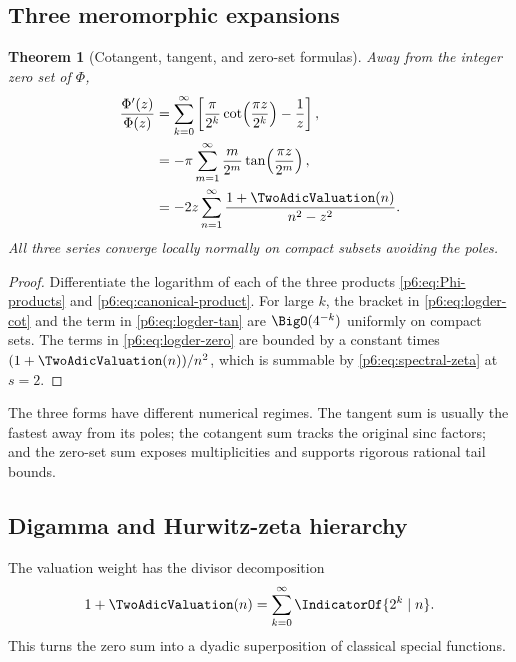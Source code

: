 \documentclass[11pt]{article}
\newtheorem{theorem}{Theorem}[section]
\theoremstyle{definition}
\theoremstyle{remark}
\begin{document}
\subsection{Three meromorphic expansions}

\begin{theorem}[Cotangent, tangent, and zero-set formulas]\label{p6:thm:three-logder}
Away from the integer zero set of \(\Phi\),
\begin{align}
 \frac{\Phi'(z)}{\Phi(z)}
 &=\sum_{k=0}^{\infty}
 \left[
 \frac{\pi}{2^k}\cot\!\left(\frac{\pi z}{2^k}\right)-\frac1z
 \right],                                                    \label{p6:eq:logder-cot}\\
 &=-\pi\sum_{m=1}^{\infty}\frac{m}{2^m}
 \tan\!\left(\frac{\pi z}{2^m}\right),                    \label{p6:eq:logder-tan}\\
 &=-2z\sum_{n=1}^{\infty}\frac{1+\TwoAdicValuation(n)}{n^2-z^2}.       \label{p6:eq:logder-zero}
\end{align}
All three series converge locally normally on compact subsets avoiding the poles.
\end{theorem}

\begin{proof}
Differentiate the logarithm of each of the three products
\eqref{p6:eq:Phi-products} and \eqref{p6:eq:canonical-product}.  For large \(k\), the bracket
in \eqref{p6:eq:logder-cot} and the term in \eqref{p6:eq:logder-tan} are \(\BigO(4^{-k})\)
uniformly on compact sets.  The terms in \eqref{p6:eq:logder-zero} are bounded by a constant
times \((1+\TwoAdicValuation(n))/n^2\), which is summable by \eqref{p6:eq:spectral-zeta} at \(s=2\).
\end{proof}

The three forms have different numerical regimes.  The tangent sum is usually the fastest
away from its poles; the cotangent sum tracks the original sinc factors; and the zero-set
sum exposes multiplicities and supports rigorous rational tail bounds.

\subsection{Digamma and Hurwitz-zeta hierarchy}

The valuation weight has the divisor decomposition
\begin{equation}
 1+\TwoAdicValuation(n)=\sum_{k=0}^{\infty}\IndicatorOf{2^k\mid n}.     \label{p6:eq:valuation-indicators}
\end{equation}
This turns the zero sum into a dyadic superposition of classical special functions.
\end{document}
